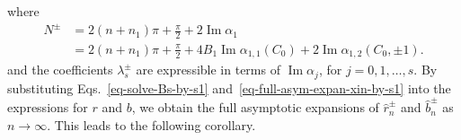 \documentclass[12pt]{article}
\theoremstyle{plain}
\theoremstyle{definition}
\numberwithin{equation}{section}
\renewcommand\Im{\operatorname{Im}}
\begin{document}
where
\begin{equation}\label{eq-def-N}
\begin{split}
N^{\pm}&=2(n+n_{1})\pi+\frac{\pi}{2}+2\Im\alpha_{1}\\
&=2(n+n_{1})\pi+\frac{\pi}{2}+4B_{1}\Im\alpha_{1,1}(C_{0})+ 2\Im\alpha_{1,2}(C_{0},\pm 1).
\end{split}
\end{equation}
and the coefficients \( \lambda_{s}^{\pm} \) are expressible in terms of \( \Im \alpha_{j} \), for \( j = 0, 1, \ldots, s \).
By substituting Eqs.~\eqref{eq-solve-Bs-by-s1} and~\eqref{eq-full-asym-expan-xin-by-s1} into the expressions for \( r \) and \( b \), we obtain the full asymptotic expansions of \( \hat{r}_{n}^{\pm} \) and \( \hat{b}_{n}^{\pm} \) as \( n \to \infty \). This leads to the following corollary.
\end{document}
